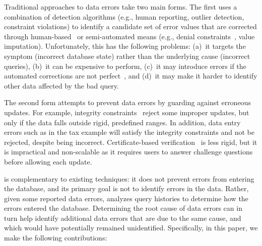 % 
Traditional approaches to data errors take two main forms. The first
uses a combination of detection algorithms (e.g., human reporting,
outlier detection, constraint violations) to identify a candidate set
of error values that are corrected through
human-based~\cite{haasclamshell,Gokhale:2014wv,Kandel:2011vj} or
semi-automated means (e.g., denial constraints~\cite{ChuIP13}, value
imputation). Unfortunately, this has the following problems: (a)~it targets the symptom (incorrect
database state) rather than the underlying cause (incorrect queries),
(b)~it can be expensive to perform, (c)~it may introduce errors if
the automated corrections are not perfect~\cite{cleaningbenchmark}, and (d)~it may make it harder to identify other data affected by the bad query.

The second form attempts to prevent data errors by guarding against erroneous updates.  For example, integrity constraints~\cite{Khoussainova2006} reject some improper updates, but only if the data falls outside rigid, predefined ranges.  In addition, data entry errors such as in the tax example will satisfy the integrity constraints and not be rejected, despite being incorrect.  Certificate-based verification~\cite{Chen2011} is less rigid, but it is impractical and non-scalable as it requires users to answer challenge questions before allowing each update.

\sys is complementary to existing techniques: it does not prevent errors from entering the database, and its primary goal is not to identify errors in the data.  Rather, given some reported data errors, \sys analyzes query histories to determine how the errors entered the database. Determining the root cause of data errors can in turn help identify additional data errors that are due to the same cause, and which would have potentially remained unidentified.  Specifically, in this paper, we make the following contributions:


